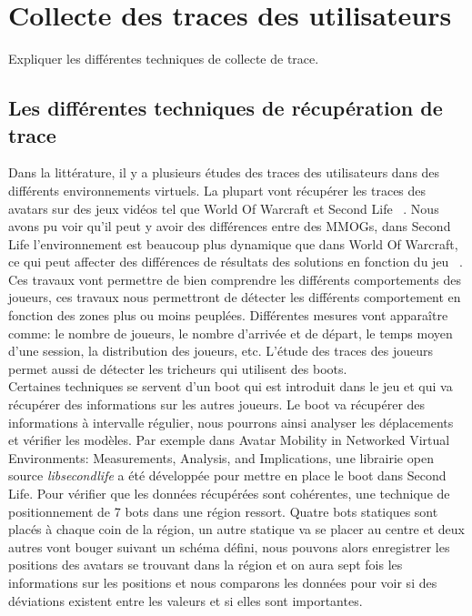 \section{Collecte des traces des utilisateurs}
	\label{trace}
	Expliquer les différentes techniques de collecte de trace.
	\subsection{Les différentes techniques de récupération de trace}
	Dans la littérature, il y a plusieurs études des traces des utilisateurs dans des différents environnements virtuels. La plupart vont récupérer les traces des avatars sur des jeux vidéos tel que World Of Warcraft et Second Life ~\cite{1326262,0295-5075-88-4-48007}. Nous avons pu voir qu'il peut y avoir des différences entre des MMOGs, dans Second Life l'environnement est beaucoup plus dynamique que dans World Of Warcraft, ce qui peut affecter des différences de résultats des solutions en fonction du jeu ~\cite{DBLP:journals/corr/abs-0807-2328,1613041}. Ces travaux vont permettre de bien comprendre les différents comportements des joueurs, ces travaux nous permettront de détecter les différents comportement en fonction des zones plus ou moins peuplées. Différentes mesures vont apparaître comme: le nombre de joueurs, le nombre d'arrivée et de départ, le temps moyen d'une session, la distribution des joueurs, etc. L'étude des traces des joueurs permet aussi de détecter les tricheurs qui utilisent des boots. \\
	
	Certaines techniques se servent d'un boot qui est introduit dans le jeu et qui va récupérer des informations sur les autres joueurs. Le boot va récupérer des informations à intervalle régulier, nous pourrons ainsi analyser les déplacements et vérifier les modèles. Par exemple dans {Avatar Mobility in Networked Virtual Environments: Measurements, Analysis, and Implications}, une librairie open source \textit{libsecondlife} a été développée pour mettre en place le boot dans Second Life. Pour vérifier que les données récupérées sont cohérentes, une technique de positionnement de 7 bots dans une région ressort. Quatre bots statiques sont placés à chaque coin de la région, un autre statique va se placer au centre et deux autres vont bouger suivant un schéma défini, nous pouvons alors enregistrer les positions des avatars se trouvant dans la région et on aura sept fois les informations sur les positions et nous comparons les données pour voir si des déviations existent entre les valeurs et si elles sont importantes.\\  
 	
